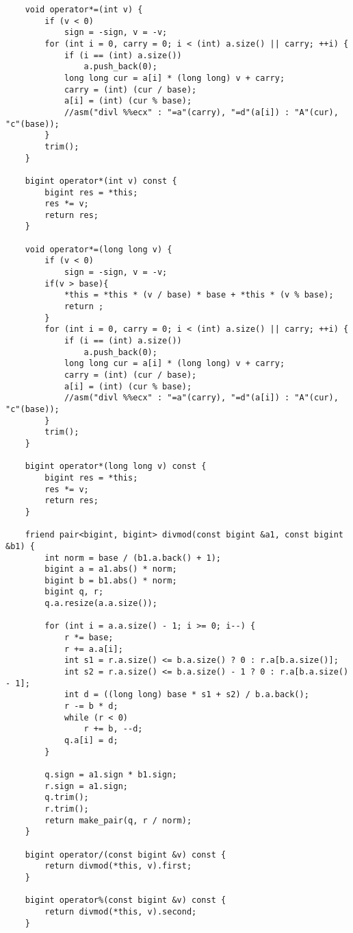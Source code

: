 \documentclass[a4paper,12pt]{report}
\begin{document}
\begin{lstlisting}
    void operator*=(int v) {
        if (v < 0)
            sign = -sign, v = -v;
        for (int i = 0, carry = 0; i < (int) a.size() || carry; ++i) {
            if (i == (int) a.size())
                a.push_back(0);
            long long cur = a[i] * (long long) v + carry;
            carry = (int) (cur / base);
            a[i] = (int) (cur % base);
            //asm("divl %%ecx" : "=a"(carry), "=d"(a[i]) : "A"(cur), "c"(base));
        }
        trim();
    }

    bigint operator*(int v) const {
        bigint res = *this;
        res *= v;
        return res;
    }

    void operator*=(long long v) {
        if (v < 0)
            sign = -sign, v = -v;
        if(v > base){
            *this = *this * (v / base) * base + *this * (v % base);
            return ;
        }
        for (int i = 0, carry = 0; i < (int) a.size() || carry; ++i) {
            if (i == (int) a.size())
                a.push_back(0);
            long long cur = a[i] * (long long) v + carry;
            carry = (int) (cur / base);
            a[i] = (int) (cur % base);
            //asm("divl %%ecx" : "=a"(carry), "=d"(a[i]) : "A"(cur), "c"(base));
        }
        trim();
    }

    bigint operator*(long long v) const {
        bigint res = *this;
        res *= v;
        return res;
    }

    friend pair<bigint, bigint> divmod(const bigint &a1, const bigint &b1) {
        int norm = base / (b1.a.back() + 1);
        bigint a = a1.abs() * norm;
        bigint b = b1.abs() * norm;
        bigint q, r;
        q.a.resize(a.a.size());

        for (int i = a.a.size() - 1; i >= 0; i--) {
            r *= base;
            r += a.a[i];
            int s1 = r.a.size() <= b.a.size() ? 0 : r.a[b.a.size()];
            int s2 = r.a.size() <= b.a.size() - 1 ? 0 : r.a[b.a.size() - 1];
            int d = ((long long) base * s1 + s2) / b.a.back();
            r -= b * d;
            while (r < 0)
                r += b, --d;
            q.a[i] = d;
        }

        q.sign = a1.sign * b1.sign;
        r.sign = a1.sign;
        q.trim();
        r.trim();
        return make_pair(q, r / norm);
    }

    bigint operator/(const bigint &v) const {
        return divmod(*this, v).first;
    }

    bigint operator%(const bigint &v) const {
        return divmod(*this, v).second;
    }


\end{lstlisting}
\end{document}
